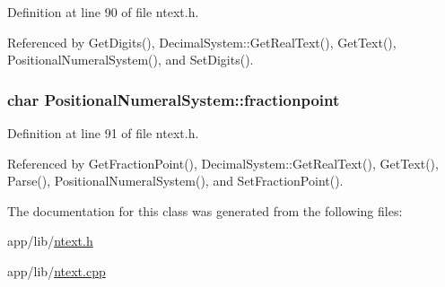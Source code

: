 Definition at line 90 of file ntext.\+h.



Referenced by Get\+Digits(), Decimal\+System\+::\+Get\+Real\+Text(), Get\+Text(), Positional\+Numeral\+System(), and Set\+Digits().

\subsubsection[{\texorpdfstring{fractionpoint}{fractionpoint}}]{\setlength{\rightskip}{0pt plus 5cm}char Positional\+Numeral\+System\+::fractionpoint\hspace{0.3cm}{\ttfamily [protected]}}\hypertarget{classPositionalNumeralSystem_ad986e454b020c21e70f2efbc3682e44f}{}\label{classPositionalNumeralSystem_ad986e454b020c21e70f2efbc3682e44f}


Definition at line 91 of file ntext.\+h.



Referenced by Get\+Fraction\+Point(), Decimal\+System\+::\+Get\+Real\+Text(), Get\+Text(), Parse(), Positional\+Numeral\+System(), and Set\+Fraction\+Point().



The documentation for this class was generated from the following files\+:\begin{DoxyCompactItemize}
\item 
app/lib/\hyperlink{ntext_8h}{ntext.\+h}\item 
app/lib/\hyperlink{ntext_8cpp}{ntext.\+cpp}\end{DoxyCompactItemize}
